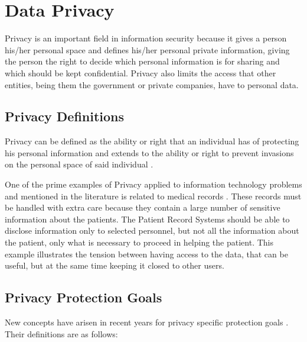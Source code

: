 \section{Data Privacy} 
\label{sec:DataPrivacy}

Privacy is an important field in information security because it gives a person his/her personal space and defines his/her personal private information, giving the person the right to decide which personal information is for sharing and which should be kept confidential. Privacy also limits the access that other entities, being them the government or private companies, have to personal data.


\subsection{Privacy Definitions}
\label{ssec:PrivacyDefinitions}


Privacy can be defined as the ability or right that an individual has of protecting his personal information and extends to the ability or right to prevent invasions on the personal space of said individual \cite{anderson2008security}.

One of the prime examples of Privacy applied to information technology problems and mentioned in the literature is related to medical records \cite{Lu2014}. These records must be handled with extra care because they contain a large number of sensitive information about the patients. The Patient Record Systems should be able to disclose information only to selected personnel, but not all the information about the patient, only what is necessary to proceed in helping the patient. This example illustrates the tension between having access to the data, that can be useful, but at the same time keeping it closed to other users.



\subsection{Privacy Protection Goals}
\label{ssec:PrivacyProtectionGoals}

New concepts have arisen in recent years for privacy specific protection goals \cite{Danezis2015}. Their definitions are as follows:

